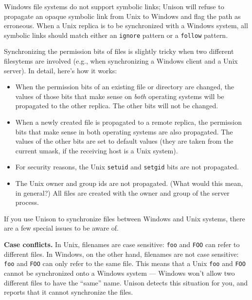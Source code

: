 \documentclass{article}
\begin{document}
Windows file systems do not support symbolic links; Unison will refuse
to propagate an opaque symbolic link from Unix to Windows and flag the
path as erroneous.  When a Unix replica is to be synchronized with a
Windows system, all symbolic links should match either an
\verb|ignore| pattern or a \verb|follow| pattern.



Synchronizing the permission bits of files is slightly tricky when two
different filesytems are involved (e.g., when synchronizing a Windows
client and a Unix server).  In detail, here's how it works:
\begin{itemize}
\item When the permission bits of an existing file or directory are
changed, the values of those bits that make sense on {\em both}
operating systems will be propagated to the other replica.  The other
bits will not be changed.  
\item When a newly created file is propagated to a remote replica, the
permission bits that make sense in both operating systems are also
propagated.  The values of the other bits are set to default values
(they are taken from the current umask, if the receiving host is a
Unix system).
\item For security reasons, the Unix \verb|setuid| and \verb|setgid|
bits are not propagated.  
\item The Unix owner and group ids are not propagated.  (What would
this mean, in general?)  All files are created with the owner and
group of the server process.
\end{itemize}




If you use Unison to synchronize files between Windows and Unix
systems, there are a few special issues to be aware of.

\textbf{Case conflicts.}  In Unix, filenames are case sensitive:
\texttt{foo} and \texttt{FOO} can refer to different files.  In
Windows, on the other hand, filenames are not case sensitive:
\texttt{foo} and \texttt{FOO} can only refer to the same file.  This
means that a Unix \texttt{foo} and \texttt{FOO} cannot be synchronized
onto a Windows system --- Windows won't allow two different files to
have the ``same'' name.  Unison detects this situation for you, and
reports that it cannot synchronize the files.  
\end{document}
